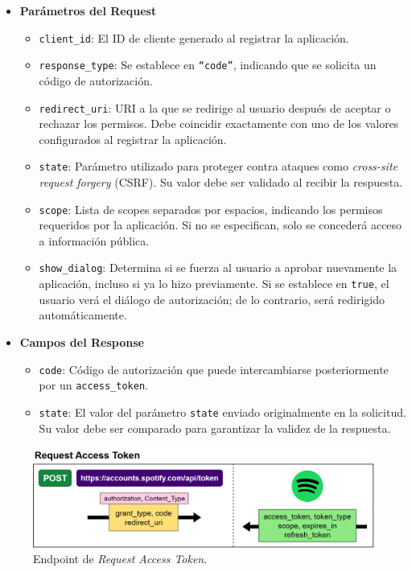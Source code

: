 \begin{itemize}
    \item \textbf{Parámetros del Request}
          \begin{itemize}
              \item \texttt{client\_id}: El ID de cliente generado al registrar la aplicación.
              \item \texttt{response\_type}: Se establece en \texttt{``code''}, indicando que se solicita un código de autorización.
              \item \texttt{redirect\_uri}: URI a la que se redirige al usuario después de aceptar o rechazar los permisos. Debe coincidir exactamente con uno de los valores configurados al registrar la aplicación.
              \item \texttt{state}: Parámetro utilizado para proteger contra ataques como \textit{cross-site request forgery} (CSRF). Su valor debe ser validado al recibir la respuesta.
              \item \texttt{scope}: Lista de scopes separados por espacios, indicando los permisos requeridos por la aplicación. Si no se especifican, solo se concederá acceso a información pública.
              \item \texttt{show\_dialog}: Determina si se fuerza al usuario a aprobar nuevamente la aplicación, incluso si ya lo hizo previamente. Si se establece en \texttt{true}, el usuario verá el diálogo de autorización; de lo contrario, será redirigido automáticamente.
          \end{itemize}
    \item \textbf{Campos del Response}
          \begin{itemize}
              \item \texttt{code}: Código de autorización que puede intercambiarse posteriormente por un \texttt{access\_token}.
              \item \texttt{state}: El valor del parámetro \texttt{state} enviado originalmente en la solicitud. Su valor debe ser comparado para garantizar la validez de la respuesta.
          \end{itemize}
\end{itemize}

\begin{figure}[H]
    \centering
    \includegraphics[width=\textwidth]{figures/endpoints/request_access_token.png}
    \caption{Endpoint de \textit{Request Access Token}.}
    \label{fig:req_access_token}
\end{figure}

